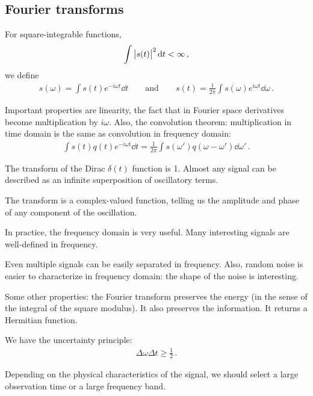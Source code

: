 \documentclass[main.tex]{subfiles}
\begin{document}

\subsection{Fourier transforms}

For square-integrable functions, 
%
\begin{align}
\int \abs{s(t)}^2 \dd{t} < \infty 
\,,
\end{align}
%
we define 
%
\begin{align}
s(\omega ) = \int s(t) e^{-i \omega t} \dd{t}
\qquad \text{and} \qquad
s(t) = \frac{1}{2 \pi } \int s(\omega ) e^{i \omega t} \dd{\omega } 
\,.
\end{align}

Important properties are linearity, the fact that in Fourier space derivatives become multiplication by \(i \omega \). 
Also, the convolution theorem: multiplication in time domain is the same as convolution in frequency domain: 
%
\begin{align}
\int s(t) q(t) e^{-i \omega t} \dd{t} = \frac{1}{2 \pi } \int s(\omega') q (\omega - \omega') \dd{\omega'}
\,.
\end{align}

The transform of the Dirac \(\delta(t) \) function is 1.
Almost any signal can be described as an infinite superposition of oscillatory terms. 

The transform is a complex-valued function, telling us the amplitude and phase of any component of the oscillation.

In practice, the frequency domain is very useful. Many interesting signals are well-defined in frequency.

Even multiple signals can be easily separated in frequency. 
Also, random noise is easier to characterize in frequency domain: the shape of the noise is interesting.

Some other properties: the Fourier transform preserves the energy (in the sense of the integral of the square modulus). 
It also preserves the information. It returns a Hermitian function. 

We have the uncertainty principle: 
%
\begin{align}
\Delta \omega \Delta t \geq \frac{1}{2} 
\,.
\end{align}

Depending on the physical characteristics of the signal, we should select a large observation time or a large frequency band.
\end{document}
